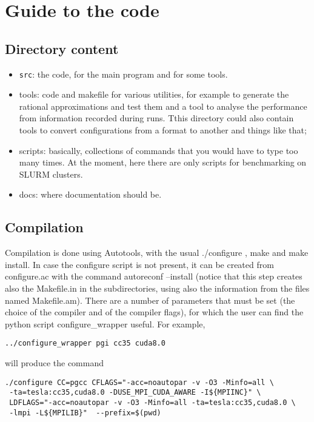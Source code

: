 
\chapter{Guide to the code}

\section{Directory content}

\begin{itemize}
    \item \texttt{src}: the code, for the main program and for some tools.
    \item tools: code and makefile for various utilities, for example to generate the rational approximations and test them and a tool to analyse the performance from information recorded during runs. Tthis directory could also contain tools to convert configurations from a format to another and things like that; 
    \item scripts: basically, collections of commands that you would have to type too many times. 
    At the moment, here there are only scripts for benchmarking on SLURM clusters.
    \item docs: where documentation should be.
\end{itemize}
\section{Compilation}
\label{compilation}
Compilation is done using Autotools, with the usual {\sf ./configure} , {\sf make} and {\sf make install}.
In case the {\sf configure} script is not present, it can be created from {\sf configure.ac} 
with the command{ \sf autoreconf --install} (notice that this step creates also the {\sf Makefile.in} in the subdirectories, 
using also the information from the files named {\sf Makefile.am}). 
There are a number of parameters that must be set (the choice of the compiler and of the compiler flags), for which the user can find the python script {\sf configure\_wrapper} useful. For example,
\begin{verbatim}
../configure_wrapper pgi cc35 cuda8.0
\end{verbatim}
will produce the command
\begin{verbatim}
./configure CC=pgcc CFLAGS="-acc=noautopar -v -O3 -Minfo=all \
 -ta=tesla:cc35,cuda8.0 -DUSE_MPI_CUDA_AWARE -I${MPIINC}" \
 LDFLAGS="-acc=noautopar -v -O3 -Minfo=all -ta=tesla:cc35,cuda8.0 \
 -lmpi -L${MPILIB}"  --prefix=$(pwd)
\end{verbatim}

